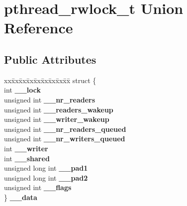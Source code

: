 \hypertarget{unionpthread__rwlock__t}{\section{pthread\+\_\+rwlock\+\_\+t Union Reference}
\label{unionpthread__rwlock__t}
}
\subsection*{Public Attributes}
\begin{DoxyCompactItemize}
\item 
\hypertarget{unionpthread__rwlock__t_a3aa07cf1dbe9d3d7ec2d1625016b57fb}{\begin{tabbing}
xx\=xx\=xx\=xx\=xx\=xx\=xx\=xx\=xx\=\kill
struct \{\\
\hypertarget{structpthread__rwlock__t_1_1@17_a5f7b1f3dc490b0f8abe6c633dc02a8b4}{\>int {\bfseries \_\_lock}\\
\hypertarget{structpthread__rwlock__t_1_1@17_a0e25b590254c6d5ad0202a077d99fe0f}{\>unsigned int {\bfseries \_\_nr\_readers}\\
\hypertarget{structpthread__rwlock__t_1_1@17_a6aecf13b58aaa0e2e4aabf7b7f4ee943}{\>unsigned int {\bfseries \_\_readers\_wakeup}\\
\hypertarget{structpthread__rwlock__t_1_1@17_a7cc34f5fc0088a9360619b41e63f808c}{\>unsigned int {\bfseries \_\_writer\_wakeup}\\
\hypertarget{structpthread__rwlock__t_1_1@17_a249ad1b6421f2e943242efeefd6f1c53}{\>unsigned int {\bfseries \_\_nr\_readers\_queued}\\
\hypertarget{structpthread__rwlock__t_1_1@17_a2a6235ef5ba1db1aff506e8e8d3fd985}{\>unsigned int {\bfseries \_\_nr\_writers\_queued}\\
\hypertarget{structpthread__rwlock__t_1_1@17_ae0c130cd48165f630985b027ccfc6ec3}{\>int {\bfseries \_\_writer}\\
\hypertarget{structpthread__rwlock__t_1_1@17_a3fcd8a3f2aff547625445f21026386db}{\>int {\bfseries \_\_shared}\\
\hypertarget{structpthread__rwlock__t_1_1@17_a464392904cece584a680d936479ba06b}{\>unsigned long int {\bfseries \_\_pad1}\\
\hypertarget{structpthread__rwlock__t_1_1@17_ab21ad2474eb5226720a7ea73b3156edd}{\>unsigned long int {\bfseries \_\_pad2}\\
\hypertarget{structpthread__rwlock__t_1_1@17_a8583a5f18c64148f305b1591d77d5db9}{\>unsigned int {\bfseries \_\_flags}\\
\} {\bfseries \_\_data}}\label{unionpthread__rwlock__t_a3aa07cf1dbe9d3d7ec2d1625016b57fb}
\\

}}}}}}}}}}
\end{tabbing}}
\end{DoxyCompactItemize}
